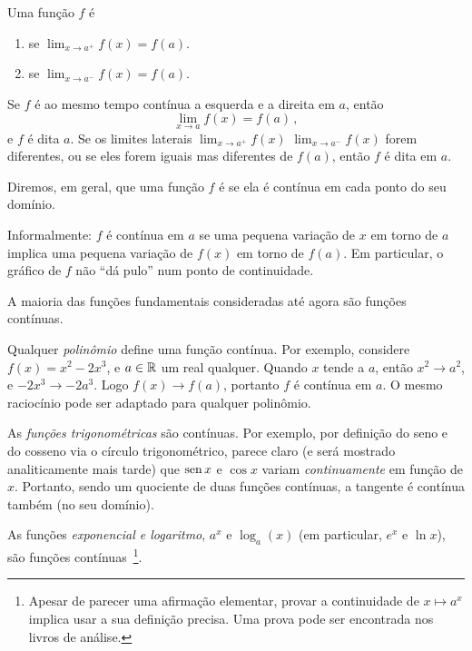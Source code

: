 \begin{defin}
Uma função $f$ é 
\begin{enumerate}
\item {} se $\lim_{x\to
a^+}f(x)=f(a)$.
\item {} se $\lim_{x\to
a^-}f(x)=f(a)$.
\end{enumerate}
Se $f$ é ao mesmo tempo contínua a esquerda e a direita em $a$, então
\[
\lim_{x\to a}f(x)=f(a)\,,
\]
e $f$ é dita $a$. 
Se os limites laterais $\lim_{x\to a^+}f(x)$ $\lim_{x\to a^-}f(x)$ forem
diferentes, ou se eles forem iguais mas diferentes de $f(a)$, 
então $f$ é dita  em $a$.
\end{defin}

Diremos, em geral, que uma função $f$ é  se ela é contínua em cada ponto
do seu domínio.

\begin{obs}
Informalmente: $f$ é contínua em $a$ se uma pequena
variação de $x$ em torno de $a$ implica uma pequena variação de
$f(x)$ em torno de $f(a)$. 
Em particular, o gráfico de $f$ não ``dá pulo'' num ponto de
continuidade.
\end{obs}

A maioria das funções fundamentais consideradas até agora são funções 
contínuas. 

\begin{ex}
Qualquer \emph{polinômio} define uma função contínua.
Por exemplo, considere $f(x)=x^2-2x^3$, e $a\in \mathbb{R}$ um real qualquer. Quando $x$
tende a $a$, então $x^2\to a^2$, e $-2x^3\to -2a^3$. Logo
$f(x)\to f(a)$, portanto $f$ é contínua em $a$. O mesmo raciocínio
pode ser adaptado para qualquer polinômio.
\end{ex}

\begin{ex}
As \emph{funções trigonométricas} são contínuas. 
Por exemplo, por definição do seno e do cosseno via o círculo trigonométrico, parece
claro (e será mostrado analiticamente mais tarde) 
que $\operatorname{sen} x$ e $\cos x$ variam \emph{continuamente} em função de $x$. 
Portanto, sendo um quociente de duas funções contínuas, a tangente é
contínua também (no seu domínio).\\
\end{ex}

\begin{ex}
As funções \emph{exponencial e logaritmo}, $a^x$ e $\log_a(x)$ (em particular, $e^x$ e
$\ln x$), são funções contínuas~\footnote{Apesar de parecer uma afirmação elementar,
provar a
continuidade de $x\mapsto a^x$ implica usar a sua definição precisa. Uma prova pode ser
encontrada nos livros de análise.}.
\end{ex}

